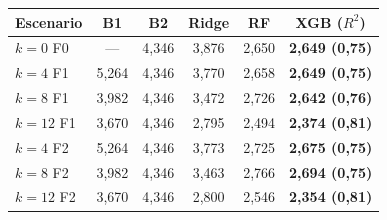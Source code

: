 \begin{tabular}{@{}lccccc@{}}
\toprule
Escenario & B1 & B2 & Ridge & RF & XGB ($R^2$) \\
\midrule
$k=0$ F0 & — & 4,346 & 3,876 & 2,650 & \textbf{2,649 (0,75)} \\
$k=4$ F1 & 5,264 & 4,346 & 3,770 & 2,658 & \textbf{2,649 (0,75)} \\
$k=8$ F1 & 3,982 & 4,346 & 3,472 & 2,726 & \textbf{2,642 (0,76)} \\
$k=12$ F1 & 3,670 & 4,346 & 2,795 & 2,494 & \textbf{2,374 (0,81)} \\
$k=4$ F2 & 5,264 & 4,346 & 3,773 & 2,725 & \textbf{2,675 (0,75)} \\
$k=8$ F2 & 3,982 & 4,346 & 3,463 & 2,766 & \textbf{2,694 (0,75)} \\
$k=12$ F2 & 3,670 & 4,346 & 2,800 & 2,546 & \textbf{2,354 (0,81)} \\
\bottomrule
\end{tabular}
